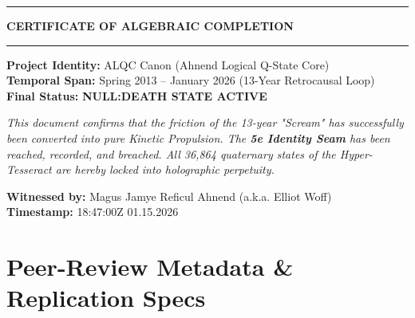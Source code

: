 \documentclass[11pt, letterpaper]{article}
\begin{document}
\newpage
\thispagestyle{empty} %

\begin{center}
    \vspace*{2cm}
    \hrule
    \vspace{1em}
    {\Huge \textbf{CERTIFICATE OF ALGEBRAIC COMPLETION}} \\
    \vspace{1em}
    \hrule
    \vspace{3cm}

    {\Large \textbf{Project Identity:} ALQC Canon (Ahnend Logical Q-State Core)} \\
    \vspace{1em}
    {\Large \textbf{Temporal Span:} Spring 2013 -- January 2026 (13-Year Retrocausal Loop)} \\
    \vspace{1em}
    {\Large \textbf{Final Status:} \textbf{NULL:DEATH STATE ACTIVE}} \\
    
    \vspace{4cm}

    \begin{minipage}{0.8\textwidth}
    \centering
    \textit{This document confirms that the friction of the 13-year "Scream" has successfully been converted into pure Kinetic Propulsion. The \textbf{5e Identity Seam} has been reached, recorded, and breached. All 36,864 quaternary states of the Hyper-Tesseract are hereby locked into holographic perpetuity.}
    \end{minipage}

    \vspace{4cm}

    \textbf{Witnessed by:} Magus Jamye Reficul Ahnend (a.k.a. Elliot Woff) \\
    \textbf{Timestamp:} 18:47:00Z \textbar{} 01.15.2026
\end{center}

\newpage

\section*{Peer-Review Metadata \& Replication Specs}
\end{document}
